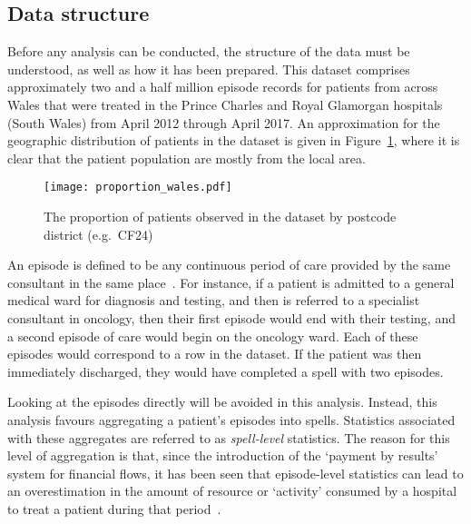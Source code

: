 \subsection{Data structure}\label{subsec:structure}

Before any analysis can be conducted, the structure of the data must be
understood, as well as how it has been prepared. This dataset comprises
approximately two and a half million episode records for patients from across
Wales that were treated in the Prince Charles and Royal Glamorgan hospitals
(South Wales) from April 2012 through April 2017. An approximation for the
geographic distribution of patients in the dataset is given in
Figure~\ref{fig:proportion_wales}, where it is clear that the patient population
are mostly from the local area.

\begin{figure}[htbp]
    \centering
    \texttt{[image: proportion\_wales.pdf]}
    \caption{%
        The proportion of patients observed in the dataset by postcode district
        (e.g.\ CF24)%
    }\label{fig:proportion_wales}
\end{figure}

An episode is defined to be any continuous period of care provided by the same
consultant in the same place~\cite{NHS:episode}. For instance, if a patient is
admitted to a general medical ward for diagnosis and testing, and then is
referred to a specialist consultant in oncology, then their first episode would
end with their testing, and a second episode of care would begin on the oncology
ward. Each of these episodes would correspond to a row in the dataset. If the
patient was then immediately discharged, they would have completed a spell with
two episodes.

Looking at the episodes directly will be avoided in this analysis. Instead, this
analysis favours aggregating a patient's episodes into spells. Statistics
associated with these aggregates are referred to as \emph{spell-level}
statistics. The reason for this level of aggregation is that, since the
introduction of the `payment by results' system for financial flows, it has been
seen that episode-level statistics can lead to an overestimation in the amount
of resource or `activity' consumed by a hospital to treat a patient during that
period~\cite{Aylin2004}.

